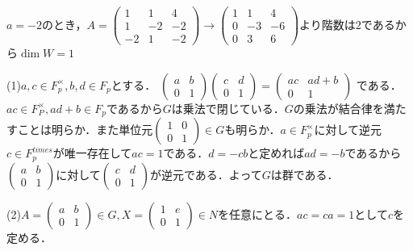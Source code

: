 \documentclass[
		book,
		head_space=20mm,
		foot_space=20mm,
		gutter=10mm,
		line_length=190mm
]{jlreq}
\begin{document}
$a=-2$のとき，$A=\begin{pmatrix}
    1 & 1 & 4 \\
    1 & -2 & -2 \\
    -2 & 1 & -2
    \end{pmatrix}\rightarrow \begin{pmatrix}
        1 & 1 & 4 \\
        0 & -3 & -6 \\
        0 & 3 & 6
        \end{pmatrix}$より階数は$2$であるから$\dim W=1$

(1)$a,c \in F_p^{\times},b,d \in F_p$とする．
$\begin{pmatrix}
    a & b \\
    0 & 1
\end{pmatrix}\begin{pmatrix}
    c & d \\
    0 & 1
\end{pmatrix}= \begin{pmatrix}
    ac & ad+b \\
    0 & 1
    \end{pmatrix}$
    である．$ac \in F_P^{\times},ad+b \in F_p$であるから$G$は乗法で閉じている．$G$の乗法が結合律を満たすことは明らか．また単位元$\begin{pmatrix}
        1 & 0 \\
        0 & 1
        \end{pmatrix} \in G$も明らか．$a \in F_p^{\times}$に対して逆元$c\in F_p^{times}$が唯一存在して$ac=1$である．$d=-cb$と定めれば$ad=-b$であるから$\begin{pmatrix}
            a & b \\
            0 & 1
        \end{pmatrix}$に対して$\begin{pmatrix}
            c & d \\
            0 & 1
        \end{pmatrix}$が逆元である．よって$G$は群である．

(2)$A=\begin{pmatrix}
    a & b \\
    0 & 1
    \end{pmatrix} \in G, X=\begin{pmatrix}
        1 & e \\
        0 & 1
        \end{pmatrix} \in N$を任意にとる．$ac=ca=1$として$c$を定める．
\end{document}
